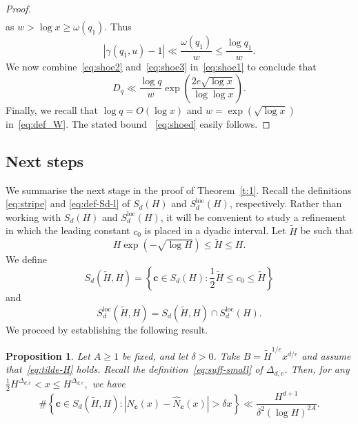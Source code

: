 \documentclass[11pt,letterpaper]{amsart}
\renewcommand{\leq}{\leqslant}
\renewcommand{\geq}{\geqslant}
\newtheorem{proposition}[theorem]{Proposition}
\theoremstyle{definition}
\numberwithin{equation}{section}
\renewcommand{\c}{\mathbf{c}}
\newcommand{\0}{\mathbf{0}}
\begin{document}
\begin{proof}
\begin{align*}
\end{align*}
as $w>\log x\geq \omega(q_1)$.
Thus
\begin{equation}\label{eq:shoe3}
\left|\gamma(q_1,u)-1\right|\ll \frac{\omega(q_1)}{ w}\leq \frac{\log q_1}{w}.
\end{equation}
We now combine~\eqref{eq:shoe2} and~\eqref{eq:shoe3} in~\eqref{eq:shoe1} to conclude
that 
$$
D_q\ll  \frac{\log q}{ w}\exp\left(\frac{2e \sqrt{\log x}}{\log\log x}\right).
$$
Finally, we recall that 
$\log q=O(\log x)$ and 
$w=\exp(\sqrt{\log x})$ in~\eqref{eq:def_W}.
The stated bound ~\eqref{eq:shoed} easily follows.
\end{proof}





\subsection{Next steps}

We   summarise the next stage in the proof of Theorem~\ref{t:1}.
Recall the definitions \eqref{eq:stripe} and  
\eqref{eq:def-Sd-l} of  
$S_d(H)$ and $S_d^{\text{loc}}(H)$, respectively.  
Rather than working with 
$S_d(H)$ and $S_d^{\text{loc}}(H)$, it will be convenient to study a refinement in which 
the leading constant $c_0$ is placed in a dyadic interval. Let  $\tilde H$ be such that 
\begin{equation}\label{eq:tilde-H}
H \exp\left(-\sqrt{\log H}\right)
\leq \tilde H \leq H.
\end{equation}
We define 
\begin{equation}\label{eq:Sd+}
S_d(\tilde H, H)=
\left\{\c\in S_d(H): \frac{1}{2}\tilde H\leq c_0\leq \tilde H \right\}
\end{equation}
and 
\begin{equation}\label{eq:Sdloc}
S_d^{\text{loc}}(\tilde H, H)=S_d(\tilde H, H)\cap 
S_d^{\text{loc}}(H).
\end{equation}
We proceed by establishing the following result.

\begin{proposition}\label{p:STEP1}
Let $A\geq 1$ be fixed, and let $\delta>0$. Take $B=\tilde H^{1/e}x^{d/e}$ and assume that~\eqref{eq:tilde-H} holds. 
Recall the definition~\eqref{eq:suff-small} of $\Delta_{d,e}$. 
Then, for any 
$
\frac{1}{2}H^{\Delta_{d,e}}< x\leq H^{\Delta_{d,e}},
$
we have 
$$
\#\left\{ \c\in S_d(\tilde H, H): |N_\c(x)-\hat N_\c(x)|>\delta x\right\} \ll
\frac{ H^{d+1}}{\delta^2  (\log H)^{2A}}.
$$
\end{proposition}
\end{document}
